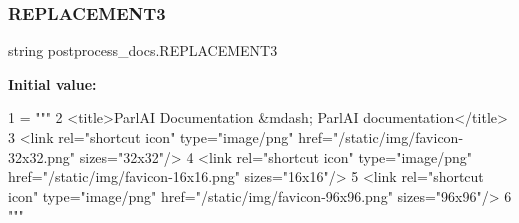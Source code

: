 \subsubsection{\texorpdfstring{R\+E\+P\+L\+A\+C\+E\+M\+E\+N\+T3}{REPLACEMENT3}}
{\footnotesize\ttfamily string postprocess\+\_\+docs.\+R\+E\+P\+L\+A\+C\+E\+M\+E\+N\+T3}

{\bfseries Initial value\+:}
\begin{DoxyCode}
1 =  \textcolor{stringliteral}{"""}
2 \textcolor{stringliteral}{<title>ParlAI Documentation &mdash; ParlAI  documentation</title>}
3 \textcolor{stringliteral}{<link rel="shortcut icon" type="image/png" href="/static/img/favicon-32x32.png" sizes="32x32"/>}
4 \textcolor{stringliteral}{<link rel="shortcut icon" type="image/png" href="/static/img/favicon-16x16.png" sizes="16x16"/>}
5 \textcolor{stringliteral}{<link rel="shortcut icon" type="image/png" href="/static/img/favicon-96x96.png" sizes="96x96"/>}
6 \textcolor{stringliteral}{"""}
\end{DoxyCode}
